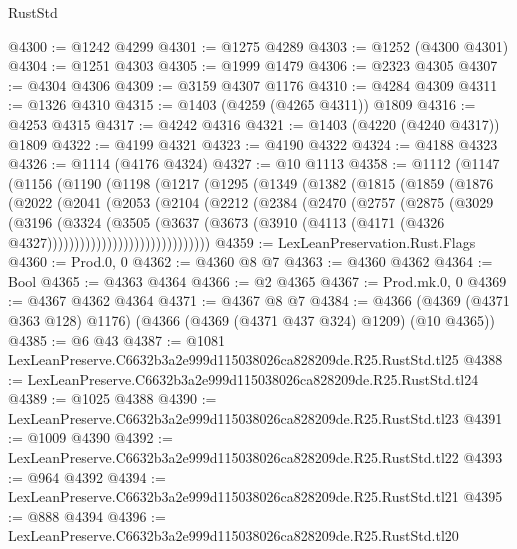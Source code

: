 \begin{lexlean}{RustStd}
\begin{coremodule}
@4300 := @1242 @4299
@4301 := @1275 @4289
@4303 := @1252 (@4300 @4301)
@4304 := @1251 @4303
@4305 := @1999 @1479
@4306 := @2323 @4305
@4307 := @4304 @4306
@4309 := @3159 @4307 @1176
@4310 := @4284 @4309
@4311 := @1326 @4310
@4315 := @1403 (@4259 (@4265 @4311)) @1809
@4316 := @4253 @4315
@4317 := @4242 @4316
@4321 := @1403 (@4220 (@4240 @4317)) @1809
@4322 := @4199 @4321
@4323 := @4190 @4322
@4324 := @4188 @4323
@4326 := @1114 (@4176 @4324)
@4327 := @10 @1113
@4358 := @1112
    (@1147
      (@1156
        (@1190
          (@1198
            (@1217
              (@1295
                (@1349
                  (@1382
                    (@1815
                      (@1859
                        (@1876
                          (@2022
                            (@2041
                              (@2053
                                (@2104
                                  (@2212
                                    (@2384
                                      (@2470
                                        (@2757
                                          (@2875
                                            (@3029
                                              (@3196
                                                (@3324
                                                  (@3505
                                                    (@3637
                                                      (@3673
                                                        (@3910
                                                          (@4113
                                                            (@4171
                                                              (@4326
                                                                @4327))))))))))))))))))))))))))))))
@4359 := LexLeanPreservation.Rust.Flags
@4360 := Prod.{0, 0}
@4362 := @4360 @8 @7
@4363 := @4360 @4362
@4364 := Bool
@4365 := @4363 @4364
@4366 := @2 @4365
@4367 := Prod.mk.{0, 0}
@4369 := @4367 @4362 @4364
@4371 := @4367 @8 @7
@4384 := @4366 (@4369 (@4371 @363 @128) @1176) (@4366 (@4369 (@4371 @437 @324) @1209) (@10 @4365))
@4385 := @6 @43
@4387 := @1081 LexLeanPreserve.C6632b3a2e999d115038026ca828209de.R25.RustStd.tl25
@4388 := LexLeanPreserve.C6632b3a2e999d115038026ca828209de.R25.RustStd.tl24
@4389 := @1025 @4388
@4390 := LexLeanPreserve.C6632b3a2e999d115038026ca828209de.R25.RustStd.tl23
@4391 := @1009 @4390
@4392 := LexLeanPreserve.C6632b3a2e999d115038026ca828209de.R25.RustStd.tl22
@4393 := @964 @4392
@4394 := LexLeanPreserve.C6632b3a2e999d115038026ca828209de.R25.RustStd.tl21
@4395 := @888 @4394
@4396 := LexLeanPreserve.C6632b3a2e999d115038026ca828209de.R25.RustStd.tl20

\end{coremodule}
\end{lexlean}
